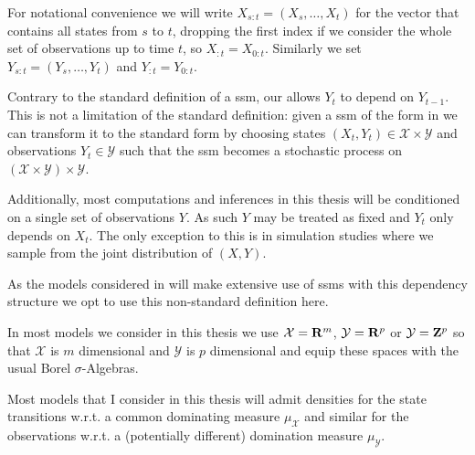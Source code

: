 For notational convenience we will write $X_{s:t} = \left(X_s, \dots, X_{t}\right)$ for the vector that contains all states from $s$ to $t$, dropping the first index if we consider the whole set of observations up to time $t$, so $X_{:t} = X_{0:t}$.
Similarly we set $Y_{s:t} = \left(Y_s, \dots, Y_{t}\right)$ and $Y_{:t} = Y_{0:t}$.


\begin{remark}
    Contrary to the standard definition of a \gls{ssm}, our  allows $Y_t$ to depend on $Y_{t - 1}$.
    This is not a limitation of the standard definition: given a \gls{ssm} of the form in  we can transform it to the standard form by choosing states $(X_t, Y_t) \in \mathcal X \times \mathcal Y$ and observations $Y_t \in \mathcal Y$ such that the \gls{ssm} becomes a stochastic process on $ \left( \mathcal X \times \mathcal Y\right) \times \mathcal Y$.

    Additionally, most computations and inferences in this thesis will be conditioned on a single set of observations $Y$. As such $Y$ may be treated as fixed and $Y_{t}$ only depends on $X_{t}$. The only exception to this is in simulation studies where we sample from the joint distribution of $(X, Y)$.

    As the models considered in  will make extensive use of \glspl{ssm} with this dependency structure we opt to use this non-standard definition here.

    In most models we consider in this thesis we use $\mathcal X = \mathbf R^m$, $\mathcal Y = \mathbf R^p$ or $\mathcal Y = \mathbf Z^p$ so that $\mathcal X$ is $m$ dimensional and $\mathcal Y$ is $p$ dimensional and equip these spaces with the usual Borel $\sigma$-Algebras.
\end{remark}

Most models that I consider in this thesis will admit densities for the state transitions w.r.t. a common dominating measure $\mu_{\mathcal X}$ and similar for the observations w.r.t. a (potentially different) domination measure $\mu_{\mathcal Y}$. 

